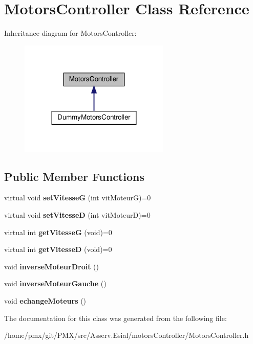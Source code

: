 \hypertarget{classMotorsController}{}\section{Motors\+Controller Class Reference}
\label{classMotorsController}


Inheritance diagram for Motors\+Controller\+:
\nopagebreak
\begin{figure}[H]
\begin{center}
\leavevmode
\includegraphics[width=203pt]{classMotorsController__inherit__graph}
\end{center}
\end{figure}
\subsection*{Public Member Functions}
\begin{DoxyCompactItemize}
\item 
\mbox{\label{classMotorsController_a3391221a28b580d66ad8b2204da810bc}} 
virtual void {\bfseries set\+VitesseG} (int vit\+MoteurG)=0
\item 
\mbox{\label{classMotorsController_aa8425783b97ac306d763e025bbc77f3f}} 
virtual void {\bfseries set\+VitesseD} (int vit\+MoteurD)=0
\item 
\mbox{\label{classMotorsController_a4b73dfd89781d5d7c3ac925960f97dce}} 
virtual int {\bfseries get\+VitesseG} (void)=0
\item 
\mbox{\label{classMotorsController_a595fc6501e549bb75a30b2c4e7d0daab}} 
virtual int {\bfseries get\+VitesseD} (void)=0
\item 
\mbox{\label{classMotorsController_a4e66dd7e8f03a88bc3aee0196d6c5a94}} 
void {\bfseries inverse\+Moteur\+Droit} ()
\item 
\mbox{\label{classMotorsController_a86fb45cd4c23ce115e9fe4b1d7b6d628}} 
void {\bfseries inverse\+Moteur\+Gauche} ()
\item 
\mbox{\label{classMotorsController_aa40d367b16dc0588aa6fcc01d0e57b05}} 
void {\bfseries echange\+Moteurs} ()
\end{DoxyCompactItemize}


The documentation for this class was generated from the following file\+:\begin{DoxyCompactItemize}
\item 
/home/pmx/git/\+P\+M\+X/src/\+Asserv.\+Esial/motors\+Controller/Motors\+Controller.\+h\end{DoxyCompactItemize}
